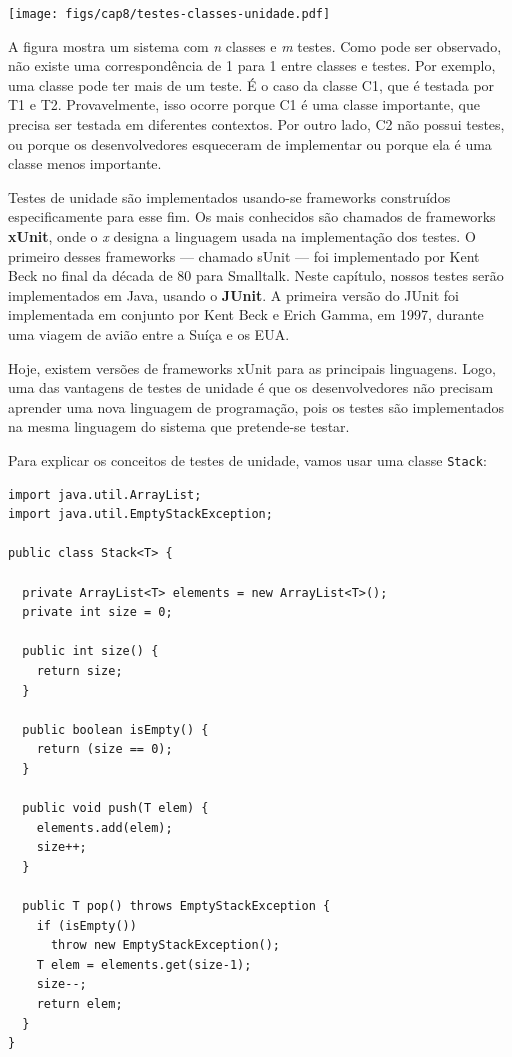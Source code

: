 \documentclass[
  11pt,
  twoside]{book}
\newcommand{\passthrough}[1]{#1}
\let\origfigure\figure
\let\endorigfigure\endfigure
\renewenvironment{figure}[1][2] {
    \expandafter\origfigure\expandafter[!h]
} {
    \endorigfigure
}
\begin{document}
\begin{figure}
\centering
\texttt{[image: figs/cap8/testes-classes-unidade.pdf]}
\caption{Correspondência entre classes e testes}
\end{figure}

A figura mostra um sistema com \emph{n} classes e \emph{m} testes. Como
pode ser observado, não existe uma correspondência de 1 para 1 entre
classes e testes. Por exemplo, uma classe pode ter mais de um teste. É o
caso da classe C1, que é testada por T1 e T2. Provavelmente, isso ocorre
porque C1 é uma classe importante, que precisa ser testada em diferentes
contextos. Por outro lado, C2 não possui testes, ou porque os
desenvolvedores esqueceram de implementar ou porque ela é uma classe
menos importante.

 
   
Testes de unidade são implementados usando-se frameworks construídos
especificamente para esse fim. Os mais conhecidos são chamados de
frameworks \textbf{xUnit}, onde o \emph{x} designa a linguagem usada na
implementação dos testes. O primeiro desses frameworks --- chamado sUnit
--- foi implementado por Kent Beck no final da década de 80 para
Smalltalk. Neste capítulo, nossos testes serão implementados em Java,
usando o \textbf{JUnit}. A primeira versão do JUnit foi implementada em
conjunto por Kent Beck e Erich Gamma, em 1997, durante uma viagem de
avião entre a Suíça e os EUA.

Hoje, existem versões de frameworks xUnit para as principais linguagens.
Logo, uma das vantagens de testes de unidade é que os desenvolvedores
não precisam aprender uma nova linguagem de programação, pois os testes
são implementados na mesma linguagem do sistema que pretende-se testar.

Para explicar os conceitos de testes de unidade, vamos usar uma classe
\passthrough{\lstinline!Stack!}:

\begin{lstlisting}
import java.util.ArrayList;
import java.util.EmptyStackException;

public class Stack<T> {

  private ArrayList<T> elements = new ArrayList<T>();
  private int size = 0;

  public int size() {
    return size;
  }

  public boolean isEmpty() {
    return (size == 0);
  }

  public void push(T elem) {
    elements.add(elem);
    size++;
  }

  public T pop() throws EmptyStackException {
    if (isEmpty())
      throw new EmptyStackException();
    T elem = elements.get(size-1);
    size--;
    return elem;
  }
}
\end{lstlisting}
\end{document}
